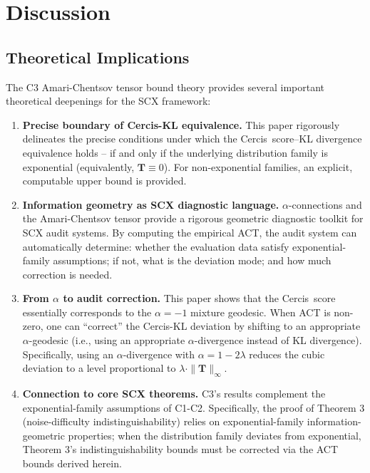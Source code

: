 \documentclass[12pt,a4paper]{article}
\theoremstyle{plain}
\theoremstyle{definition}
\theoremstyle{remark}
\newcommand{\SCX}{\textsf{SCX}}
\newcommand{\Cercis}{\textsf{Cercis}}
\newcommand{\ACT}{\mathbf{T}}    %
\begin{document}
\section{Discussion}
\label{sec:discussion}

\subsection{Theoretical Implications}

The C3 Amari-Chentsov tensor bound theory provides several important theoretical deepenings for the \SCX{} framework:

\begin{enumerate}[label=(\arabic*), leftmargin=*]
    \item \textbf{Precise boundary of \Cercis-KL equivalence.} This paper rigorously delineates the precise conditions under which the \Cercis\ score--KL divergence equivalence holds -- if and only if the underlying distribution family is exponential (equivalently, $\ACT \equiv 0$). For non-exponential families, an explicit, computable upper bound is provided.
    \item \textbf{Information geometry as \SCX{} diagnostic language.} $\alpha$-connections and the Amari-Chentsov tensor provide a rigorous geometric diagnostic toolkit for \SCX{} audit systems. By computing the empirical ACT, the audit system can automatically determine: whether the evaluation data satisfy exponential-family assumptions; if not, what is the deviation mode; and how much correction is needed.
    \item \textbf{From $\alpha$ to audit correction.} This paper shows that the \Cercis\ score essentially corresponds to the $\alpha = -1$ mixture geodesic. When ACT is non-zero, one can ``correct'' the \Cercis-KL deviation by shifting to an appropriate $\alpha$-geodesic (i.e., using an appropriate $\alpha$-divergence instead of KL divergence). Specifically, using an $\alpha$-divergence with $\alpha = 1 - 2\lambda$ reduces the cubic deviation to a level proportional to $\lambda \cdot \|\ACT\|_{\infty}$.
    \item \textbf{Connection to core \SCX{} theorems.} C3's results complement the exponential-family assumptions of C1-C2. Specifically, the proof of Theorem 3 (noise-difficulty indistinguishability) relies on exponential-family information-geometric properties; when the distribution family deviates from exponential, Theorem 3's indistinguishability bounds must be corrected via the ACT bounds derived herein.
\end{enumerate}
\end{document}
